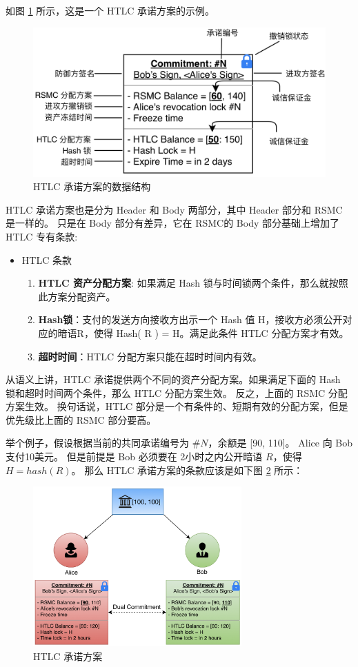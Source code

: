 如图 \ref{fig:htlc} 所示，这是一个 HTLC 承诺方案的示例。

\begin{figure}[h!]
    \centering
    \includegraphics[width=12cm, keepaspectratio]{../images/HTLC.png}
    \caption{HTLC 承诺方案的数据结构}
    \label{fig:htlc}
\end{figure}

HTLC 承诺方案也是分为 Header 和 Body 两部分，其中 Header 部分和 RSMC 是一样的。
只是在 Body 部分有差异，它在 RSMC的 Body 部分基础上增加了 HTLC 专有条款:
\begin{itemize}
    \item HTLC 条款
        \begin{enumerate}
            \item \textbf{HTLC 资产分配方案}: 如果满足 Hash 锁与时间锁两个条件，那么就按照此方案分配资产。
            \item \textbf{Hash锁}：支付的发送方向接收方出示一个 Hash 值 H，接收方必须公开对应的暗语R，使得 Hash( R ) = H。满足此条件 HTLC 分配方案才有效。
            \item \textbf{超时时间}：HTLC 分配方案只能在超时时间内有效。
        \end{enumerate}
\end{itemize}

从语义上讲，HTLC 承诺提供两个不同的资产分配方案。如果满足下面的 Hash 锁和超时时间两个条件，那么 HTLC 分配方案生效。
反之，上面的 RSMC 分配方案生效。
换句话说，HTLC 部分是一个有条件的、短期有效的分配方案，但是优先级比上面的 RSMC 部分要高。


举个例子，假设根据当前的共同承诺编号为 $\#N$，余额是 [90, 110]。
Alice 向 Bob 支付10美元。
但是前提是 Bob 必须要在 2小时之内公开暗语 $R$，使得 $H = hash(R)$。
那么 HTLC 承诺方案的条款应该是如下图 \ref{fig:htlc_sample} 所示：

\begin{figure}[h!]
    \centering
    \includegraphics[width=8cm, keepaspectratio]{../images/htlc_sample.png}
    \caption{HTLC 承诺方案}
    \label{fig:htlc_sample}
\end{figure}

